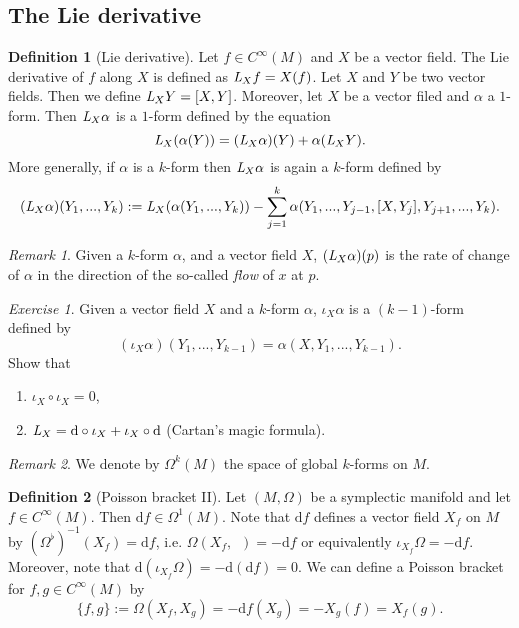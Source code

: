 \documentclass[12pt]{amsart}
\numberwithin{equation}{section}
\theoremstyle{plain}
\theoremstyle{definition}
\newtheorem{defn}{Definition}[subsection]
\theoremstyle{remark}
\newtheorem{rem}{Remark}[subsection]
\newtheorem{exe}{Exercise}[subsection]
\newcommand{\dd}{{\mathrm{d}}}
\begin{document}
\subsection{The Lie derivative}

\begin{defn}[Lie derivative]
Let $f\in C^\infty(M)$ and $X$ be a vector field. The Lie derivative of $f$ along $X$ is defined as $\emph{L}_Xf=X(f)$. Let $X$ and $Y$ be two vector fields. Then we define $\emph{L}_XY=[X,Y]$. Moreover, let $X$ be a vector filed and $\alpha$ a $1$-form. Then $\emph{L}_X\alpha$ is a $1$-form defined by the equation $$\emph{L}_X(\alpha(Y))=(\emph{L}_X\alpha)(Y)+\alpha(\emph{L}_XY).$$ More generally, if $\alpha$ is a $k$-form  then $\emph{L}_X\alpha$ is again a $k$-form defined by $$(\emph{L}_X\alpha)(Y_1,...,Y_k):=\emph{L}_X(\alpha(Y_1,...,Y_k))-\sum_{j=1}^k\alpha(Y_1,...,Y_{j-1},[X,Y_j],Y_{j+1},...,Y_k).$$
\end{defn}

\begin{rem}
Given a $k$-form $\alpha$, and a vector field $X$, $(\emph{L}_X\alpha)(p)$ is the rate of change of $\alpha$ in the direction of the so-called \emph{flow} of $x$ at $p$.
\end{rem}

\begin{exe}
Given a vector field $X$ and a $k$-form $\alpha$, $\iota_X\alpha$ is a $(k-1)$-form defined by $$(\iota_X\alpha)(Y_1,...,Y_{k-1})=\alpha(X,Y_1,...,Y_{k-1}).$$
Show that
\begin{enumerate}
\item{$\iota_X\circ\iota_X=0$,}
\item{$\emph{L}_X=\dd\circ \iota_X+\iota_X\circ\dd$ (Cartan's magic formula).}
\end{enumerate}
\end{exe}

\begin{rem}
We denote by $\Omega^k(M)$ the space of global $k$-forms on $M$.
\end{rem}

\begin{defn}[Poisson bracket II]
\label{PBII}
Let $(M,\Omega)$ be a symplectic manifold and let $f\in C^\infty(M)$. Then $\dd f\in\Omega^1(M)$. Note that $\dd f$ defines a vector field $X_f$ on $M$ by $(\Omega^\flat)^{-1}(X_f)=\dd f$, i.e. $\Omega(X_f,\enspace)=-\dd f$ or equivalently $\iota_{X_f}\Omega=-\dd f$. Moreover, note that $\dd(\iota_{X_f}\Omega)=-\dd(\dd f)=0$. We can define a Poisson bracket for $f,g\in C^\infty(M)$ by 
$$\{ f,g\}:=\Omega(X_f,X_g)=-\dd f(X_g)=-X_g(f)=X_f(g).$$
\end{defn}
\end{document}
